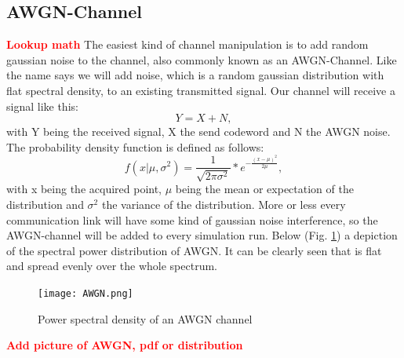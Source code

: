 \documentclass[12pt,oneside, reqno]{report}
\newcommand\boldred[1]{\textcolor{red}{\textbf{#1}}}
\begin{document}
\subsection{AWGN-Channel}
\boldred{Lookup math}
\newline
The easiest kind of channel manipulation is to add random gaussian noise to the channel, also commonly known as an \gls{AWGN}-Channel. Like the name says we will add noise, which is a random gaussian distribution with flat spectral density, to an existing transmitted signal. Our channel will receive a signal like this:
\begin{equation}
\label{eq:1.1}
Y = X + N ,
\end{equation}
 with Y being the received signal, X the send codeword and N the AWGN noise.
\newline
The probability density function is defined as follows:
\begin{equation}
\label{eq:AWGNpdf}
f(x|\mu,\sigma^2) = \frac{1}{\sqrt{2\pi\sigma^2}}*e^{-\frac{(x-\mu)^2}{2\mu}},  
\end{equation}
with x being the acquired point, $\mu$ being the mean or expectation of the distribution and $\sigma^2$ the variance of the distribution. 
\newline
More or less every communication link will have some kind of gaussian noise interference, so the AWGN-channel will be added to every simulation run.  Below (Fig. \ref{fig:AWGN}) a depiction of the spectral power distribution of AWGN. It can be clearly seen that is flat and spread evenly over the whole spectrum.
\begin{figure}[H]
	\centering
	\texttt{[image: AWGN.png]}
	\caption{Power spectral density of an AWGN channel}
	\label{fig:AWGN}
\end{figure}
\boldred{Add picture of AWGN, pdf or distribution}

\newpage
\end{document}
